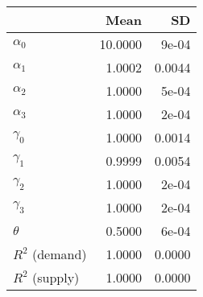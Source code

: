 
\begin{tabular}[t]{lrr}
\toprule
  & Mean & SD\\
\midrule
$\alpha_{0}$ & 10.0000 & 9e-04\\
$\alpha_{1}$ & 1.0002 & 0.0044\\
$\alpha_{2}$ & 1.0000 & 5e-04\\
$\alpha_{3}$ & 1.0000 & 2e-04\\
$\gamma_{0}$ & 1.0000 & 0.0014\\
$\gamma_{1}$ & 0.9999 & 0.0054\\
$\gamma_{2}$ & 1.0000 & 2e-04\\
$\gamma_{3}$ & 1.0000 & 2e-04\\
$\theta$ & 0.5000 & 6e-04\\
$R^{2}$ (demand) & 1.0000 & 0.0000\\
$R^{2}$ (supply) & 1.0000 & 0.0000\\
\bottomrule
\end{tabular}
